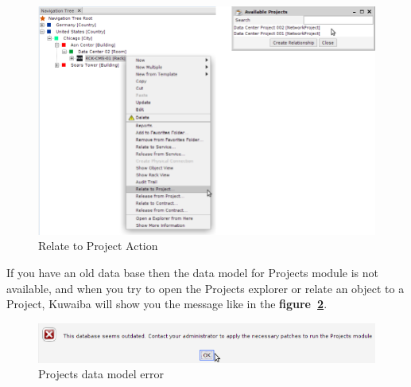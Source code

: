 \documentclass[a4paper]{article}
\begin{document}
		    \begin{figure}[h!]
		    	\centering
		    	\includegraphics[width=0.9\linewidth]{img/projects_relate_to.png}
		    	\caption{Relate to Project Action}
		    	\label{fig:projects_relate_to}
		    \end{figure}
		    
		    If you have an old data base then the data model for Projects module is not available, and when you try to open the Projects explorer or relate an object to a Project,
		    Kuwaiba will show you the message like in the \textbf{figure~\ref{fig:projects_db_outdated}}.		    
		    
		    \begin{figure}[h!]
		    	\centering
		    	\includegraphics[width=0.9\linewidth]{img/projects_db_outdated.png}
		    	\caption{Projects data model error}
		    	\label{fig:projects_db_outdated}
		    \end{figure}
		    
\end{document}
